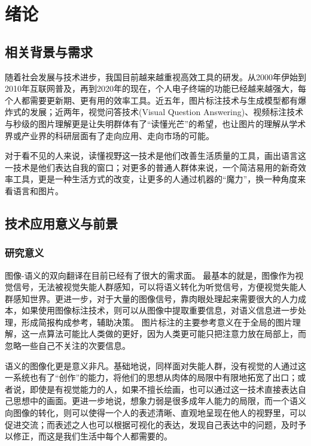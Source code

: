 
\chapter{绪论}

\section{相关背景与需求}
随着社会发展与技术进步，我国目前越来越重视高效工具的研发。从2000年伊始到2010年互联网普及，再到2020年的现在，个人电子终端的功能已经越来越强大，每个人都需要更新期、更有用的效率工具。近五年，图片标注技术与生成模型都有爆炸式的发展；近两年，视觉问答技术(Visual Question Answering)、视频标注技术与秒级的图片理解更是让失明群体有了“读懂光芒”的希望，也让图片的理解从学术界或产业界的科研层面有了走向应用、走向市场的可能。

对于看不见的人来说，读懂视野这一技术是他们改善生活质量的工具，画出语言这一技术是他们表达自我的窗口；对更多的普通人群体来说，一个简洁易用的新奇效率工具，更是一种生活方式的改变，让更多的人通过机器的“魔力”，换一种角度来看语言和图片。

\section{技术应用意义与前景}

\subsection{研究意义}
图像-语义的双向翻译在目前已经有了很大的需求面。
最基本的就是，图像作为视觉信号，无法被视觉失能人群感知，可以将语义转化为听觉信号，方便视觉失能人群感知世界。更进一步，对于大量的图像信号，靠肉眼处理起来需要很大的人力成本，如果使用图像标注技术，则可以从图像中提取重要信息，对语义信息进一步处理，形成简报构成参考，辅助决策。
图片标注的主要参考意义在于全局的图片理解，这一点算法可能比人类做的更好，因为人类更可能只把注意力放在局部上，而忽略一些自己不关注的次要信息。


语义的图像化更是意义非凡。基础地说，同样面对失能人群，没有视觉的人通过这一系统也有了“创作”的能力，将他们的思想从肉体的局限中有限地拓宽了出口；或者说，即使是有视觉能力的人，如果不擅长绘画，也可以通过这一技术直接表达自己思想中的画面。更进一步地说，想象力弱是很多成年人能力的局限，而一个语义向图像的转化，则可以使得一个人的表述清晰、直观地呈现在他人的视野里，可以促进交流；而表述之人也可以根据可视化的表达，发现自己表达中的问题，及时予以修正，而这是我们生活中每个人都需要的。

